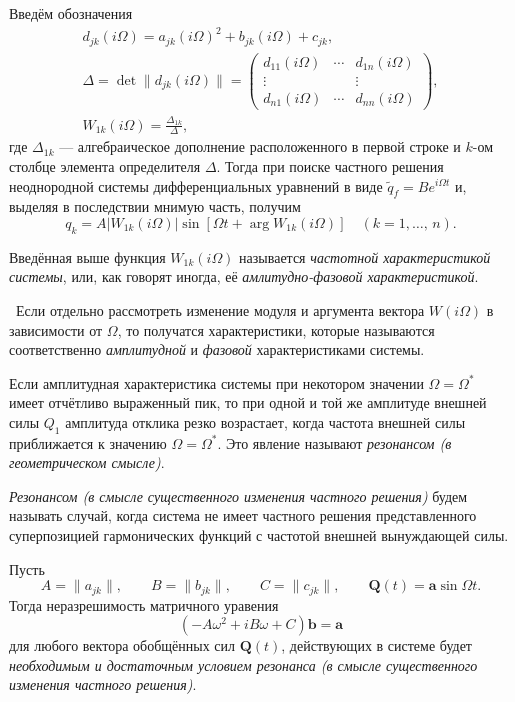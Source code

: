 \documentclass[a4paper]{article}
\begin{document}
Введём обозначения
\begin{gather*}
	d_{jk}(i\Omega)=a_{jk}(i\Omega)^2+b_{jk}(i\Omega)+c_{jk},\\
	\Delta=\det \|d_{jk}(i\Omega)\|=\begin{pmatrix} d_{11}(i\Omega) &
	\cdots & d_{1n}(i\Omega) \\ \vdots & & \vdots \\ d_{n1}(i\Omega) &
\cdots & d_{nn}(i\Omega)\end{pmatrix} ,\\
W_{1k}(i\Omega)=\frac{\Delta_{1k}}{\Delta},
\end{gather*}
где  $\Delta_{1k}$ --- алгебраическое дополнение расположенного в первой строке
и $k$-ом столбце  элемента определителя $\Delta$.
Тогда при поиске частного решения неоднородной системы дифференциальных уравнений
в виде $\tilde{q}_f=B e ^{i\Omega t}$ и, выделяя в последствии мнимую часть,
получим
\[
	q_k=A |W_{1k}(i\Omega)|\sin[\Omega t +\arg W_{1k}(i\Omega)]
	\quad (k=1,\ldots,\,n)
.\]
\begin{dfn}
	Введённая выше функция $W_{1k}(i\Omega)$ называется \emph{частотной
	характеристикой системы}, или, как говорят иногда, её
	\emph{амлитудно-фазовой
характеристикой}.
\end{dfn}
\begin{dfn}
	 Если отдельно рассмотреть изменение модуля и аргумента вектора
	$W(i\Omega)$ в зависимости от $\Omega$, то получатся характеристики,
	которые называются соответственно \emph{амплитудной} и \emph{фазовой}
	характеристиками системы.
\end{dfn}
\begin{dfn}
	Если амплитудная характеристика системы при некотором значении $\Omega=
	\Omega^*$ 
	имеет отчётливо выраженный пик, то при одной и той же амплитуде
	внешней силы $Q_1$ амплитуда отклика резко возрастает, когда частота
	внешней силы приближается к значению $\Omega=\Omega^*$. Это явление
	называют \emph{резонансом (в геометрическом смысле)}.
\end{dfn}
\begin{dfn}
	\emph{Резонансом (в смысле существенного изменения частного решения)}
	будем называть случай, когда система не имеет частного решения
	представленного суперпозицией гармонических функций с частотой
	внешней вынуждающей силы.
\end{dfn}
Пусть
\[
	A=\|a_{jk}\|,\qquad B=\|b_{jk}\|,\qquad C=\|c_{jk}\|,
	\qquad \mathbf{Q}(t)=\mathbf{a}\sin \Omega t
.\]
Тогда неразрешимость матричного уравения 
\[
	(-A \omega^2+ i B \omega+C)\mathbf{b}=\mathbf{a}
\]
для любого вектора обобщённых сил $\mathbf{Q}(t)$, действующих в системе 
будет \emph{необходимым и достаточным условием резонанса (в смысле
существенного изменения частного решения)}.
\end{document}
